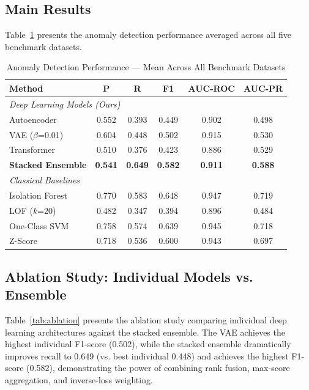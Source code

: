 \documentclass[conference]{IEEEtran}
\begin{document}
\subsection{Main Results}

Table~\ref{tab:main_results} presents the anomaly detection performance averaged across all five benchmark datasets.

\begin{table}[htbp]
\caption{Anomaly Detection Performance --- Mean Across All Benchmark Datasets}
\begin{center}
\begin{tabular}{|l|c|c|c|c|c|}
\hline
\textbf{Method} & \textbf{P} & \textbf{R} & \textbf{F1} & \textbf{AUC-ROC} & \textbf{AUC-PR} \\
\hline
\multicolumn{6}{|l|}{\textit{Deep Learning Models (Ours)}} \\
\hline
Autoencoder & 0.552 & 0.393 & 0.449 & 0.902 & 0.498 \\
VAE ($\beta$=0.01) & 0.604 & 0.448 & 0.502 & 0.915 & 0.530 \\
Transformer & 0.510 & 0.376 & 0.423 & 0.886 & 0.529 \\
\textbf{Stacked Ensemble} & \textbf{0.541} & \textbf{0.649} & \textbf{0.582} & \textbf{0.911} & \textbf{0.588} \\
\hline
\multicolumn{6}{|l|}{\textit{Classical Baselines}} \\
\hline
Isolation Forest & 0.770 & 0.583 & 0.648 & 0.947 & 0.719 \\
LOF ($k$=20) & 0.482 & 0.347 & 0.394 & 0.896 & 0.484 \\
One-Class SVM & 0.758 & 0.574 & 0.639 & 0.945 & 0.718 \\
Z-Score & 0.718 & 0.536 & 0.600 & 0.943 & 0.697 \\
\hline
\end{tabular}
\label{tab:main_results}
\end{center}
\end{table}

\subsection{Ablation Study: Individual Models vs. Ensemble}

Table~\ref{tab:ablation} presents the ablation study comparing individual deep learning architectures against the stacked ensemble. The VAE achieves the highest individual F1-score (0.502), while the stacked ensemble dramatically improves recall to 0.649 (vs. best individual 0.448) and achieves the highest F1-score (0.582), demonstrating the power of combining rank fusion, max-score aggregation, and inverse-loss weighting.
\end{document}
